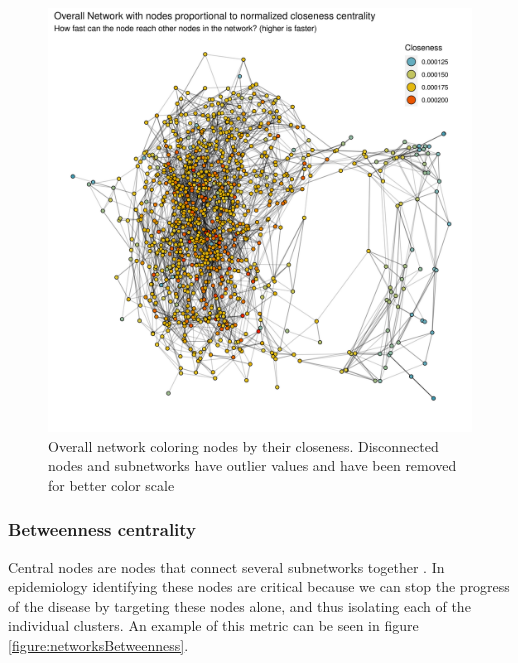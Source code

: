     \begin{figure}[h!]
        \centering
            \includegraphics[width=0.9\linewidth]{figures/Networks/Centralities/Graph_temporalEdgesDF_centralitiesDF_Closeness___mds.png} 
        \caption{Overall network coloring nodes by their closeness. Disconnected nodes and subnetworks have outlier values and have been removed for better color scale}
        \label{figure:networksCloseness}
    \end{figure}      

\subsubsection{Betweenness centrality}

Central nodes are nodes that connect several subnetworks together \cite{Freeman1978}. In epidemiology identifying these nodes are critical because we can stop the progress of the disease by targeting these nodes alone, and thus isolating each of the individual clusters. An example of this metric can be seen in figure \ref{figure:networksBetweenness}.

